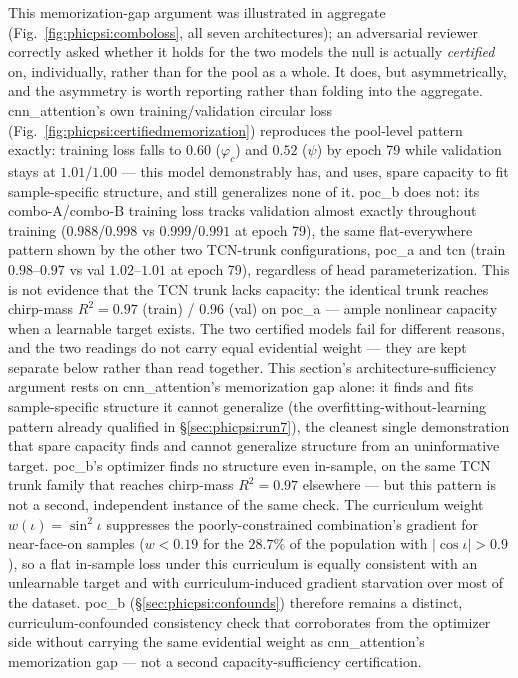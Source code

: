 This memorization-gap argument was illustrated in aggregate (Fig.~\ref{fig:phicpsi:comboloss}, all seven architectures); an adversarial reviewer correctly asked whether it holds for the two models the null is actually \emph{certified} on, individually, rather than for the pool as a whole.
It does, but asymmetrically, and the asymmetry is worth reporting rather than folding into the aggregate.
cnn\_attention's own training/validation circular loss (Fig.~\ref{fig:phicpsi:certifiedmemorization}) reproduces the pool-level pattern exactly: training loss falls to $0.60$ ($\varphi_c$) and $0.52$ ($\psi$) by epoch 79 while validation stays at $1.01$/$1.00$ --- this model demonstrably has, and uses, spare capacity to fit sample-specific structure, and still generalizes none of it.
poc\_b does not: its combo-A/combo-B training loss tracks validation almost exactly throughout training ($0.988$/$0.998$ vs $0.999$/$0.991$ at epoch 79), the same flat-everywhere pattern shown by the other two TCN-trunk configurations, poc\_a and tcn (train $0.98$--$0.97$ vs val $1.02$--$1.01$ at epoch 79), regardless of head parameterization.
This is not evidence that the TCN trunk lacks capacity: the identical trunk reaches chirp-mass $R^2 = 0.97$ (train) / $0.96$ (val) on poc\_a --- ample nonlinear capacity when a learnable target exists.
The two certified models fail for different reasons, and the two readings do not carry equal evidential weight --- they are kept separate below rather than read together.
This section's architecture-sufficiency argument rests on cnn\_attention's memorization gap alone: it finds and fits sample-specific structure it cannot generalize (the overfitting-without-learning pattern already qualified in \S\ref{sec:phicpsi:run7}), the cleanest single demonstration that spare capacity finds and cannot generalize structure from an uninformative target.
poc\_b's optimizer finds no structure even in-sample, on the same TCN trunk family that reaches chirp-mass $R^2 = 0.97$ elsewhere --- but this pattern is not a second, independent instance of the same check.
The curriculum weight $w(\iota) = \sin^2\iota$ suppresses the poorly-constrained combination's gradient for near-face-on samples ($w < 0.19$ for the $28.7\%$ of the population with $|\cos\iota| > 0.9$), so a flat in-sample loss under this curriculum is equally consistent with an unlearnable target and with curriculum-induced gradient starvation over most of the dataset.
poc\_b (\S\ref{sec:phicpsi:confounds}) therefore remains a distinct, curriculum-confounded consistency check that corroborates from the optimizer side without carrying the same evidential weight as cnn\_attention's memorization gap --- not a second capacity-sufficiency certification.

